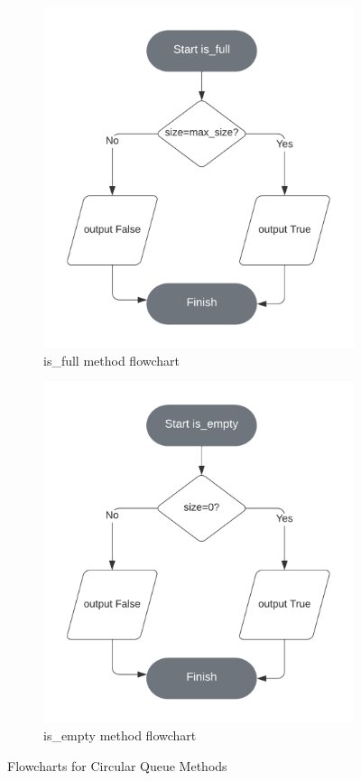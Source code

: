 \documentclass{article}
\begin{document}
\begin{figure}[ht]
    \begin{subfigure}{.5\textwidth}
        \centering
        \includegraphics[width=.8\linewidth]{is-full-circular-queue-flowchart}
        \caption{is\_full method flowchart}
    \end{subfigure}%
    \begin{subfigure}{.5\textwidth}
      \centering
      \includegraphics[width=.8\linewidth]{is-empty-circular-queue-flowchart}
        \caption{is\_empty method flowchart}
    \end{subfigure}
    \caption{Flowcharts for Circular Queue Methods}
\end{figure}
\end{document}
